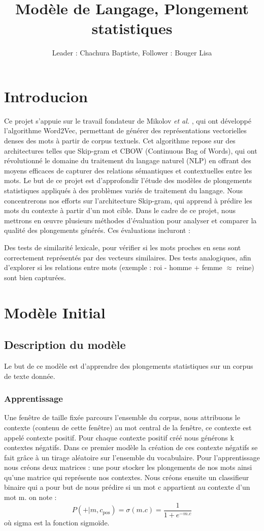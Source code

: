 \documentclass[12pt]{article}
\title{Modèle de Langage, Plongement statistiques}
\author{Leader : Chachura Baptiste, Follower : Bouger Lisa}
\begin{document}
\maketitle

\vspace{0.5in}


\section{Introducion}
Ce projet s’appuie sur le travail fondateur de Mikolov \textit{et al.} \cite{mikolov2013efficient},
qui ont développé l’algorithme Word2Vec, permettant de générer des représentations vectorielles denses des mots à partir de corpus textuels. 
Cet algorithme repose sur des architectures telles que Skip-gram et CBOW (Continuous Bag of Words), 
qui ont révolutionné le domaine du traitement du langage naturel (NLP) en offrant des moyens efficaces de capturer des relations sémantiques et contextuelles entre les mots.
Le but de ce projet est d’approfondir l’étude des modèles de plongements statistiques appliqués à des problèmes variés de traitement du langage. 
Nous concentrerons nos efforts sur l’architecture Skip-gram, qui apprend à prédire les mots du contexte à partir d’un mot cible. 
Dans le cadre de ce projet, nous mettrons en œuvre plusieurs méthodes d’évaluation pour analyser et comparer la qualité des plongements générés. Ces évaluations incluront :

Des tests de similarité lexicale, pour vérifier si les mots proches en sens sont correctement représentés par des vecteurs similaires.
Des tests analogiques, afin d'explorer si les relations entre mots (exemple : roi - homme + femme $ \approx $ reine) sont bien capturées.


\section{Modèle Initial}
\subsection{Description du modèle}
Le but de ce modèle est d'apprendre des plongements statistiques sur un corpus de texte donnée.

\subsubsection{Apprentissage}
Une fenêtre de taille fixée parcours l'ensemble du corpus, nous attribuons le contexte (contenu de cette fenêtre)
au mot central de la fenêtre, ce contexte est appelé contexte positif. Pour chaque contexte positif
créé nous générons k contextes négatifs. Dans ce premier modèle la création de ces contexte négatifs se fait 
grâce à un tirage aléatoire sur l'ensemble du vocabulaire. Pour l'apprentissage nous créons deux matrices : une 
pour stocker les plongements de nos mots ainsi qu'une matrice qui représente nos contextes. Nous créons ensuite un classifieur 
binaire qui a pour but de nous prédire si un mot c appartient au contexte d'un mot m. on note : 
\[
    P(+|m, c_{\text{pos}}) = \sigma( m.c) = \frac{1}{1+e^{-m.c}}
\]
où sigma est la fonction sigmoïde.
\end{document}
